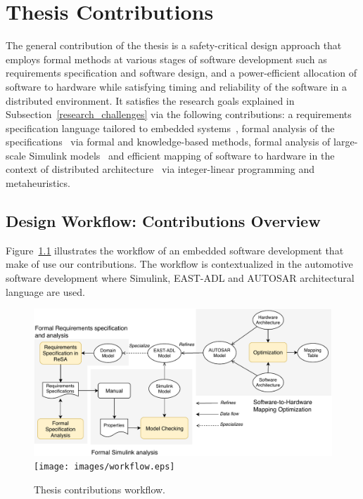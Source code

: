 \chapter{Thesis Contributions}
The general contribution of the thesis is a safety-critical design approach that employs formal methods at various stages of software development such as requirements specification and software design, and a power-efficient allocation of software to hardware while satisfying timing and reliability of the software in a distributed environment. It satisfies the research goals explained in Subsection~\ref{research_challenges} via the following contributions: a requirements specification language tailored to embedded systems~\cite{Mahmud2015ReSA:Systems}\cite{resatool}, formal analysis of the specifications~\cite{resatool}\cite{Mahmud2017SpecificationLogic} via formal and knowledge-based methods, formal analysis of large-scale Simulink models~\cite{Filipovikj2018SimppaalModels} and efficient mapping of software to hardware in the context of distributed architecture~\cite{Mahmud5222}\cite{Mahmud2019Power-awareOptimization} via integer-linear programming and metaheuristics. 

\section{Design Workflow: Contributions Overview}
Figure~\ref{fig_workflow} illustrates the workflow of an embedded software development that make of use our contributions. The workflow is contextualized in the automotive software development where Simulink, EAST-ADL and AUTOSAR architectural language are used. 
\begin{figure}[h]
	\centering
	\ifpdf
	\includegraphics[width=\linewidth]{images/workflow}
	\else
	\texttt{[image: images/workflow.eps]}
	\fi
	\caption{Thesis contributions workflow.} 
	\label{fig_workflow}
\end{figure}

